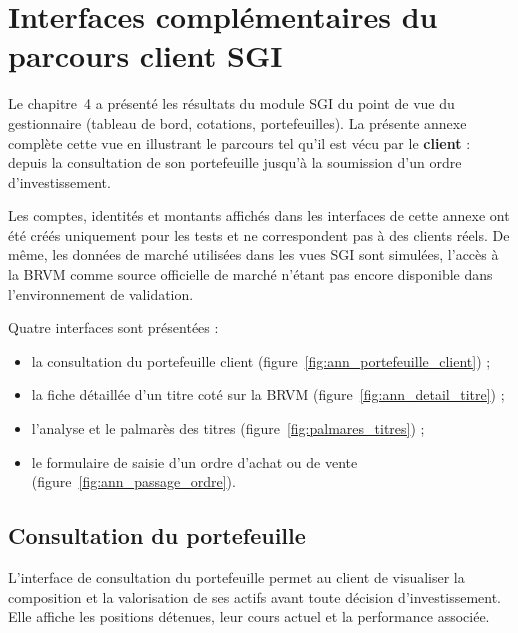 \appendix
\renewcommand{\chaptername}{Annexe}

\chapter{Interfaces complémentaires du parcours client SGI}
\label{ann:interfaces-client-sgi}

Le chapitre~4 a présenté les résultats du module SGI du point de vue du
gestionnaire (tableau de bord, cotations, portefeuilles). La présente annexe
complète cette vue en illustrant le parcours tel qu'il est vécu par le
\textbf{client} : depuis la consultation de son portefeuille jusqu'à la
soumission d'un ordre d'investissement.

Les comptes, identités et montants affichés dans les interfaces de cette
annexe ont été créés uniquement pour les tests et ne correspondent pas à des
clients réels. De même, les données de marché utilisées dans les vues SGI
sont simulées, l'accès à la BRVM \cite{brvm_actions} comme source officielle de marché n'étant pas encore disponible
dans l'environnement de validation.

Quatre interfaces sont présentées :
\begin{itemize}
  \item la consultation du portefeuille client
        (figure~\ref{fig:ann_portefeuille_client}) ;
  \item la fiche détaillée d'un titre coté sur la BRVM \cite{brvm_actions}
        (figure~\ref{fig:ann_detail_titre}) ;
  \item l'analyse et le palmarès des titres
        (figure~\ref{fig:palmares_titres}) ;
  \item le formulaire de saisie d'un ordre d'achat ou de vente
        (figure~\ref{fig:ann_passage_ordre}).
\end{itemize}

\section{Consultation du portefeuille}

L'interface de consultation du portefeuille permet au client de visualiser la
composition et la valorisation de ses actifs avant toute décision
d'investissement. Elle affiche les positions détenues, leur cours actuel et
la performance associée.

